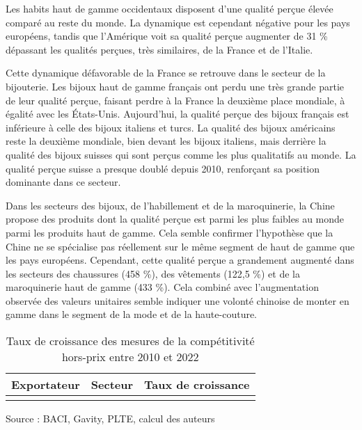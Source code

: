 \documentclass[french,10pt,a4paper]{article}
\begin{document}
Les habits haut de gamme occidentaux disposent d'une qualité perçue élevée comparé au reste du monde. La dynamique est cependant négative pour les pays européens, tandis que l'Amérique voit sa qualité perçue augmenter de 31 \% dépassant les qualités perçues, très similaires, de la France et de l'Italie.

Cette dynamique défavorable de la France se retrouve dans le secteur de la bijouterie. Les bijoux haut de gamme français ont perdu une très grande partie de leur qualité perçue, faisant perdre à la France la deuxième place mondiale, à égalité avec les États-Unis. Aujourd'hui, la qualité perçue des bijoux français est inférieure à celle des bijoux italiens et turcs. La qualité des bijoux américains reste la deuxième mondiale, bien devant les bijoux italiens, mais derrière la qualité des bijoux suisses qui sont perçus comme les plus qualitatifs au monde. La qualité perçue suisse a presque doublé depuis 2010, renforçant sa position dominante dans ce secteur.

Dans les secteurs des bijoux, de l'habillement et de la maroquinerie, la Chine propose des produits dont la qualité perçue est parmi les plus faibles au monde parmi les produits haut de gamme. Cela semble confirmer l'hypothèse que la Chine ne se spécialise pas réellement sur le même segment de haut de gamme que les pays européens. Cependant, cette qualité perçue a grandement augmenté dans les secteurs des chaussures (458 \%), des vêtements (122,5 \%) et de la maroquinerie haut de gamme (433 \%). Cela combiné avec l'augmentation observée des valeurs unitaires semble indiquer une volonté chinoise de monter en gamme dans le segment de la mode et de la haute-couture.


\begin{table}[ht]
  \centering
  \begin{tabular}{lrr}
    \hline
   Exportateur & Secteur & Taux de croissance \\
    \hline
    \\
    \hline
  \end{tabular}
  \captionsetup{justification=justified, singlelinecheck=false, font=small}
  \caption*{Source : BACI, Gavity, PLTE, calcul des auteurs}
  \captionsetup{justification=centering, singlelinecheck=true, font=normalsize}
  \caption{Taux de croissance des mesures de la compétitivité hors-prix entre 2010 et 2022}
  \label{tab:taux-croissance-hp}
\end{table}
\end{document}
